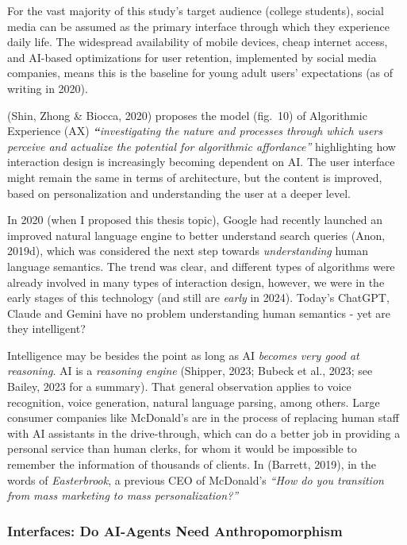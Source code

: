 \documentclass[
  letterpaper,
  DIV=11,
  numbers=noendperiod]{scrartcl}
\begin{document}
For the vast majority of this study's target audience (college
students), social media can be assumed as the primary interface through
which they experience daily life. The widespread availability of mobile
devices, cheap internet access, and AI-based optimizations for user
retention, implemented by social media companies, means this is the
baseline for young adult users' expectations (as of writing in 2020).

(Shin, Zhong \& Biocca, 2020) proposes the model (fig.~10) of
Algorithmic Experience (AX) \emph{\textbf{``}investigating the nature
and processes through which users perceive and actualize the potential
for algorithmic affordance''} highlighting how interaction design is
increasingly becoming dependent on AI. The user interface might remain
the same in terms of architecture, but the content is improved, based on
personalization and understanding the user at a deeper level.

In 2020 (when I proposed this thesis topic), Google had recently
launched an improved natural language engine to better understand search
queries (Anon, 2019d), which was considered the next step towards
\emph{understanding} human language semantics. The trend was clear, and
different types of algorithms were already involved in many types of
interaction design, however, we were in the early stages of this
technology (and still are \emph{early} in 2024). Today's ChatGPT, Claude
and Gemini have no problem understanding human semantics - yet are they
intelligent?

Intelligence may be besides the point as long as AI \emph{becomes very
good at reasoning}. AI is a \emph{reasoning engine} (Shipper, 2023;
Bubeck et al., 2023; see Bailey, 2023 for a summary). That general
observation applies to voice recognition, voice generation, natural
language parsing, among others. Large consumer companies like McDonald's
are in the process of replacing human staff with AI assistants in the
drive-through, which can do a better job in providing a personal service
than human clerks, for whom it would be impossible to remember the
information of thousands of clients. In (Barrett, 2019), in the words of
\emph{Easterbrook}, a previous CEO of McDonald's \emph{``How do you
transition from mass marketing to mass personalization?''}

\subsubsection{Interfaces: Do AI-Agents Need
Anthropomorphism}\label{interfaces-do-ai-agents-need-anthropomorphism}
\end{document}
